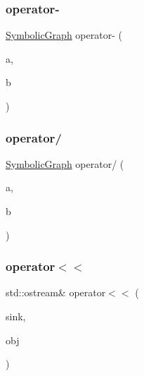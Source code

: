 \subsubsection{\texorpdfstring{operator-\/}{operator-}}
{\footnotesize\ttfamily \mbox{\hyperlink{classsymcpp_1_1SymbolicGraph}{Symbolic\+Graph}} operator-\/ (\begin{DoxyParamCaption}\item[{\mbox{\hyperlink{classsymcpp_1_1SymbolicGraph}{Symbolic\+Graph}}}]{a,  }\item[{const \mbox{\hyperlink{classsymcpp_1_1SymbolicGraph}{Symbolic\+Graph}} \&}]{b }\end{DoxyParamCaption})\hspace{0.3cm}{\ttfamily [friend]}}

\mbox{\label{classsymcpp_1_1SymbolicGraph_a75795007fbed7da119eb3ed6838c341e}} 
\subsubsection{\texorpdfstring{operator/}{operator/}}
{\footnotesize\ttfamily \mbox{\hyperlink{classsymcpp_1_1SymbolicGraph}{Symbolic\+Graph}} operator/ (\begin{DoxyParamCaption}\item[{\mbox{\hyperlink{classsymcpp_1_1SymbolicGraph}{Symbolic\+Graph}}}]{a,  }\item[{const \mbox{\hyperlink{classsymcpp_1_1SymbolicGraph}{Symbolic\+Graph}} \&}]{b }\end{DoxyParamCaption})\hspace{0.3cm}{\ttfamily [friend]}}

\mbox{\label{classsymcpp_1_1SymbolicGraph_a653fedc6ac7ca152b1d40ad887b9af42}} 
\subsubsection{\texorpdfstring{operator$<$$<$}{operator<<}}
{\footnotesize\ttfamily std\+::ostream\& operator$<$$<$ (\begin{DoxyParamCaption}\item[{std\+::ostream \&}]{sink,  }\item[{const \mbox{\hyperlink{classsymcpp_1_1SymbolicGraph}{Symbolic\+Graph}} \&}]{obj }\end{DoxyParamCaption})\hspace{0.3cm}{\ttfamily [friend]}}



